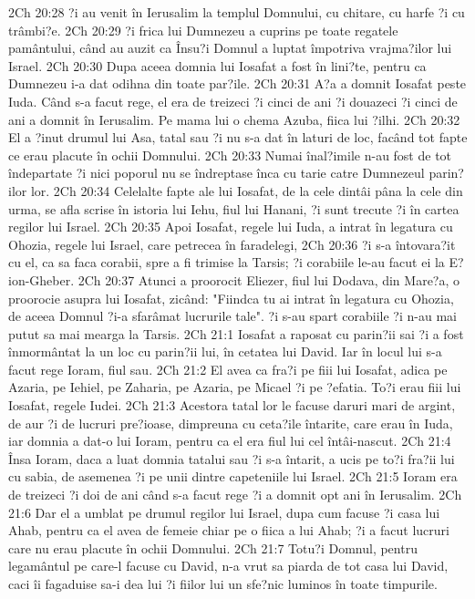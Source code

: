2Ch 20:28  ?i au venit în Ierusalim la templul Domnului, cu chitare, cu harfe ?i cu trâmbi?e.
2Ch 20:29  ?i frica lui Dumnezeu a cuprins pe toate regatele pamântului, când au auzit ca Însu?i Domnul a luptat împotriva vrajma?ilor lui Israel.
2Ch 20:30  Dupa aceea domnia lui Iosafat a fost în lini?te, pentru ca Dumnezeu i-a dat odihna din toate par?ile.
2Ch 20:31  A?a a domnit Iosafat peste Iuda. Când s-a facut rege, el era de treizeci ?i cinci de ani ?i douazeci ?i cinci de ani a domnit în Ierusalim. Pe mama lui o chema Azuba, fiica lui ?ilhi.
2Ch 20:32  El a ?inut drumul lui Asa, tatal sau ?i nu s-a dat în laturi de loc, facând tot fapte ce erau placute în ochii Domnului.
2Ch 20:33  Numai înal?imile n-au fost de tot îndepartate ?i nici poporul nu se îndreptase înca cu tarie catre Dumnezeul parin?ilor lor.
2Ch 20:34  Celelalte fapte ale lui Iosafat, de la cele dintâi pâna la cele din urma, se afla scrise în istoria lui Iehu, fiul lui Hanani, ?i sunt trecute ?i în cartea regilor lui Israel.
2Ch 20:35  Apoi Iosafat, regele lui Iuda, a intrat în legatura cu Ohozia, regele lui Israel, care petrecea în faradelegi,
2Ch 20:36  ?i s-a întovara?it cu el, ca sa faca corabii, spre a fi trimise la Tarsis; ?i corabiile le-au facut ei la E?ion-Gheber.
2Ch 20:37  Atunci a proorocit Eliezer, fiul lui Dodava, din Mare?a, o proorocie asupra lui Iosafat, zicând: "Fiindca tu ai intrat în legatura cu Ohozia, de aceea Domnul ?i-a sfarâmat lucrurile tale". ?i s-au spart corabiile ?i n-au mai putut sa mai mearga la Tarsis.
2Ch 21:1  Iosafat a raposat cu parin?ii sai ?i a fost înmormântat la un loc cu parin?ii lui, în cetatea lui David. Iar în locul lui s-a facut rege Ioram, fiul sau.
2Ch 21:2  El avea ca fra?i pe fiii lui Iosafat, adica pe Azaria, pe Iehiel, pe Zaharia, pe Azaria, pe Micael ?i pe ?efatia. To?i erau fiii lui Iosafat, regele Iudei.
2Ch 21:3  Acestora tatal lor le facuse daruri mari de argint, de aur ?i de lucruri pre?ioase, dimpreuna cu ceta?ile întarite, care erau în Iuda, iar domnia a dat-o lui Ioram, pentru ca el era fiul lui cel întâi-nascut.
2Ch 21:4  Însa Ioram, daca a luat domnia tatalui sau ?i s-a întarit, a ucis pe to?i fra?ii lui cu sabia, de asemenea ?i pe unii dintre capeteniile lui Israel.
2Ch 21:5  Ioram era de treizeci ?i doi de ani când s-a facut rege ?i a domnit opt ani în Ierusalim.
2Ch 21:6  Dar el a umblat pe drumul regilor lui Israel, dupa cum facuse ?i casa lui Ahab, pentru ca el avea de femeie chiar pe o fiica a lui Ahab; ?i a facut lucruri care nu erau placute în ochii Domnului.
2Ch 21:7  Totu?i Domnul, pentru legamântul pe care-l facuse cu David, n-a vrut sa piarda de tot casa lui David, caci îi fagaduise sa-i dea lui ?i fiilor lui un sfe?nic luminos în toate timpurile.
